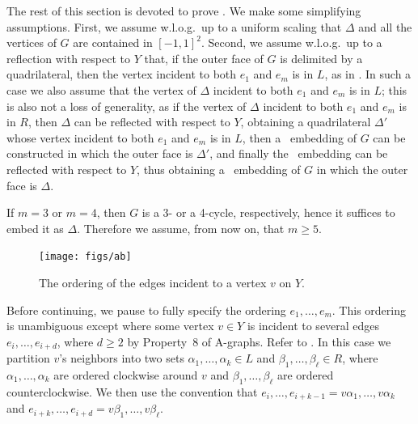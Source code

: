 The rest of this section is devoted to prove . We make some simplifying assumptions. First, we assume w.l.o.g.\ up to a uniform scaling that $\Delta$ and all the vertices of $G$ are contained in $[-1,1]^2$. Second, we assume w.l.o.g.\ up to a reflection  with respect to $Y$ that, if the outer face of $G$ is delimited by a quadrilateral, then the vertex incident to both $e_1$ and $e_m$ is in $L$, as in . In such a case we also assume that the vertex of $\Delta$ incident to both $e_1$ and $e_m$ is in $L$; this is also not a loss of generality, as if the vertex of $\Delta$ incident to both $e_1$ and $e_m$ is in $R$, then $\Delta$ can be reflected with respect to $Y$, obtaining a quadrilateral $\Delta'$ whose vertex incident to both $e_1$ and $e_m$ is in $L$, then a \Fary\ embedding of $G$ can be constructed in which the outer face is $\Delta'$, and finally the \Fary\ embedding can be reflected with respect to $Y$, thus obtaining a \Fary\ embedding of $G$ in which the outer face is $\Delta$. 

If $m=3$ or $m=4$, then $G$ is a 3- or a 4-cycle, respectively, hence it suffices to embed it as $\Delta$. Therefore we assume, from now on, that $m\ge 5$.  



	\begin{figure}
		\Vspace{-1mm}
		\centering
		\texttt{[image: figs/ab]}
		\caption{The ordering of the edges incident to a vertex $v$ on $Y$.}
	\end{figure}
Before continuing, we pause to fully specify the ordering
$e_1,\ldots,e_m$. This ordering is unambiguous except where
some vertex $v\in Y$ is incident to several edges
$e_{i},\ldots,e_{i+d}$, where $d\ge 2$ by Property~8 of A-graphs. Refer to .  In this case we partition $v$'s neighbors into two
sets $\alpha_1,\ldots,\alpha_k\in L$ and $\beta_1,\ldots,\beta_\ell\in
R$, where $\alpha_1,\ldots,\alpha_k$ are ordered clockwise around $v$
and $\beta_1,\ldots,\beta_\ell$ are ordered counterclockwise.  We then use
the convention that $e_i,\ldots,e_{i+k-1}=v\alpha_1,\ldots,v\alpha_k$
and $e_{i+k},\ldots,e_{i+d}=v\beta_1,\ldots,v\beta_\ell$.

